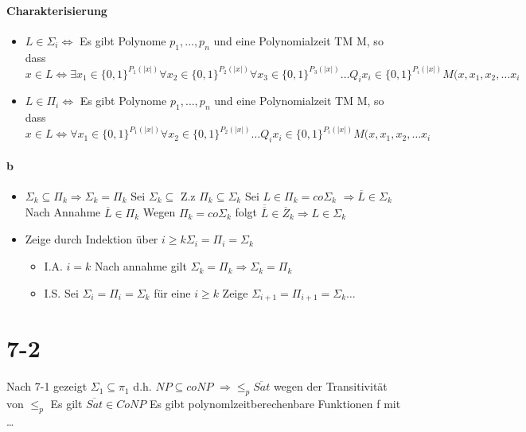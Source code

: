 \documentclass[12pt, oneside, a4paper, numbers=enddot, abstracton, parskip=full]{scrreprt}
\begin{document}
\paragraph{Charakterisierung}
\begin{itemize}
\item $L\in \Sigma_i \Leftrightarrow $ Es gibt Polynome $p_1,\dots,p_n$ und eine Polynomialzeit TM M, so dass $x\in L \Leftrightarrow \exists x_1 \in \{0,1\}^{P_1(|x|)}  \forall x_2\in \{0,1\}^{P_2(|x|)} \forall x_3\in \{0,1\}^{P_3(|x|)}  \dots Q_i x_i \in \{0,1\}^{P_i(|x|)}   M(x,x_1, x_2, \dots x_i$

\item $L\in \Pi_i \Leftrightarrow $ Es gibt Polynome $p_1,\dots,p_n$ und eine Polynomialzeit TM M, so dass $x\in L \Leftrightarrow \forall x_1\in \{0,1\}^{P_1(|x|)} \forall x_2\in \{0,1\}^{P_2(|x|)}  \dots Q_i x_i \in \{0,1\}^{P_i(|x|)}   M(x,x_1, x_2, \dots x_i$
\end{itemize}

\paragraph{b}
\begin{itemize}
\item $\Sigma_k \subseteq \Pi_k \Rightarrow \Sigma_k = \Pi_k$
Sei $\Sigma_k \subseteq$ Z.z $\Pi_k \subseteq \Sigma_k$ Sei $L\in \Pi_k = co \Sigma_k$
$\Rightarrow \overline{L} \in \Sigma_k$ Nach Annahme $\overline{L} \in \Pi_k$ Wegen $\Pi_k = co\Sigma_k$
folgt $\overline{\overline{L}} \in \overline{Z}_k \Rightarrow L \in \Sigma_k$
\item Zeige durch Indektion über $i\geq k \Sigma_i = \Pi_i = \Sigma_k$
  \begin{itemize}
  \item I.A. $i=k$ Nach annahme gilt $\Sigma_k = \Pi_k \Rightarrow \Sigma_k = \Pi_k$
  \item I.S. Sei $\Sigma_i = \Pi_i = \Sigma_k $ für eine $i\geq k$ Zeige $\Sigma_{i+1} = \Pi_{i+1} = \Sigma_{k} \dots$
  \end{itemize}
\end{itemize}

\section{7-2}
Nach 7-1 gezeigt $\Sigma_1 \subseteq \pi_1$ d.h. $NP \subseteq coNP$
$\Rightarrow \leq_p \overline{Sat}$ wegen der Transitivität von $\leq_p$
Es gilt $\overline{Sat} \in CoNP$ Es gibt polynomlzeitberechenbare Funktionen f mit \dots
\end{document}
